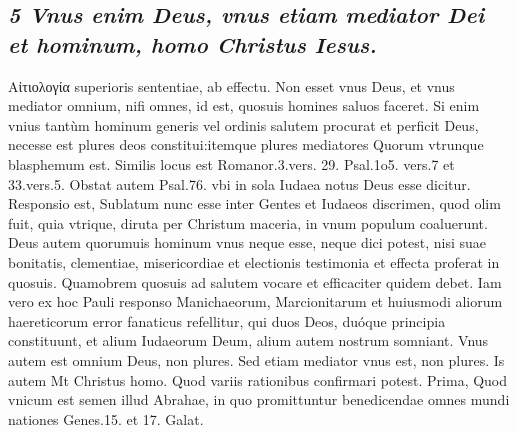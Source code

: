 \documentclass{article}
\begin{document}
\begin{pages}
\subsection*{\textit{5 Vnus enim Deus, vnus etiam mediator Dei et hominum, homo Christus Iesus. }}\pstart Αἰτιολογία superioris sententiae, ab effectu. Non esset vnus Deus, et vnus mediator omnium, nifi omnes, id est, quosuis homines saluos faceret. Si enim vnius tantùm hominum generis vel ordinis salutem procurat et perficit Deus, necesse est plures deos constitui:itemque plures mediatores Quorum vtrunque blasphemum est.  \pend\pstart Similis locus est Romanor.3.vers. 29. Psal.1o5. vers.7 et 33.vers.5.  \pend\pstart Obstat autem Psal.76. vbi in sola Iudaea notus Deus esse dicitur. Responsio est, Sublatum nunc esse inter Gentes et Iudaeos discrimen, quod olim fuit, quia vtrique, diruta per Christum maceria, in vnum populum coaluerunt.  \pend\pstart Deus autem quorumuis hominum vnus neque  esse, neque dici potest, nisi suae bonitatis, clementiae, misericordiae et electionis testimonia et effecta proferat in quosuis. Quamobrem quosuis ad salutem vocare et efficaciter quidem debet.  \pend\pstart Iam vero ex hoc Pauli responso Manichaeorum, Marcionitarum et huiusmodi aliorum haereticorum error fanaticus refellitur, qui duos Deos, duóque principia constituunt, et alium Iudaeorum Deum, alium autem nostrum somniant. Vnus autem est omnium Deus, non plures.  \pend\pstart Sed etiam mediator vnus est, non plures. Is autem Mt Christus homo. Quod variis rationibus confirmari potest. Prima, Quod vnicum est semen illud Abrahae, in quo promittuntur benedicendae omnes mundi nationes Genes.15. et 17. Galat.  \pend

\end{pages}
\end{document}
